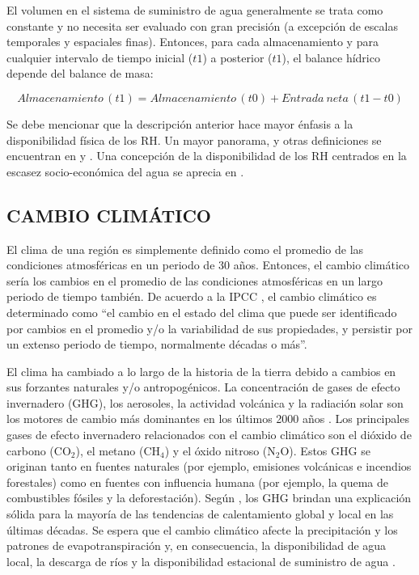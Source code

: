 \documentclass[12pt]{article}
\begin{document}
El volumen en el sistema de suministro de agua generalmente se trata como constante y no necesita ser evaluado con gran precisión (a excepción de escalas temporales y espaciales finas). Entonces, para cada almacenamiento y para cualquier intervalo de tiempo inicial ($t1$) a posterior ($t1$), el balance hídrico depende del balance de masa:

\begin{equation}
Almacenamiento\,(t1) =  Almacenamiento\,(t0) + Entrada\:neta\,(t1 - t0)
\label{equ:waterBalance_By_WMO}
\end{equation}

Se debe mencionar que la descripción anterior hace mayor énfasis a la disponibilidad física de los RH. Un mayor panorama, y otras definiciones se encuentran en \citet{xu2017water} y \citet{juniati2018proposing}. Una concepción de la disponibilidad de los RH centrados en la escasez socio-económica del agua se aprecia en \citet{sullivan2003water}.

\subsection{CAMBIO CLIMÁTICO}

El clima de una región es simplemente definido como el promedio de las condiciones atmosféricas en un periodo de 30 años. Entonces, el cambio climático sería los cambios en el promedio de las condiciones atmosféricas en un largo periodo de tiempo también. De acuerdo a la IPCC \citep{IPCC2007}, el cambio climático es determinado como ``el cambio en el estado del clima que puede ser identificado por cambios en el promedio y/o la variabilidad de sus propiedades, y persistir por un extenso periodo de tiempo, normalmente décadas o más”.

El clima ha cambiado a lo largo de la historia de la tierra debido a cambios en sus forzantes naturales y/o antropogénicos. La concentración de gases de efecto invernadero (GHG), los aerosoles, la actividad volcánica y la radiación solar son los motores de cambio más dominantes en los últimos 2000 años \citep{NRC2006}. Los principales gases de efecto invernadero relacionados con el cambio climático son el dióxido de carbono (CO$_{2}$), el metano (CH$_{4}$) y el óxido nitroso (N$_{2}$O). Estos GHG se originan tanto en fuentes naturales (por ejemplo, emisiones volcánicas e incendios forestales) como en fuentes con influencia humana (por ejemplo, la quema de combustibles fósiles y la deforestación). Según \citet{Solomon2007}, los GHG brindan una explicación sólida para la mayoría de las tendencias de calentamiento global y local en las últimas décadas. Se espera que el cambio climático afecte la precipitación y los patrones de evapotranspiración \citep{Tsanis2011} y, en consecuencia, la disponibilidad de agua local, la descarga de ríos y la disponibilidad estacional de suministro de agua \citep{Arnell2011}. 
\end{document}
